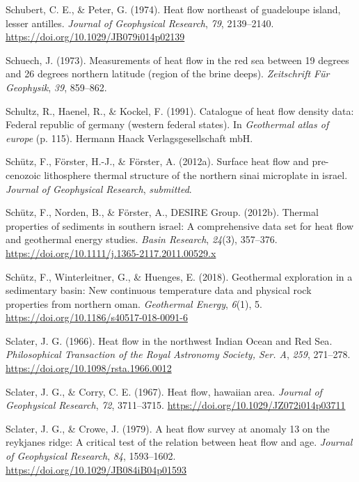 \begin{CSLReferences}{1}{1}
\leavevmode{}%
Schubert, C. E., \& Peter, G. (1974). Heat flow northeast of guadeloupe island, lesser antilles. \emph{Journal of Geophysical Research}, \emph{79}, 2139--2140. \url{https://doi.org/10.1029/JB079i014p02139}

\leavevmode{}%
Schuech, J. (1973). Measurements of heat flow in the red sea between 19 degrees and 26 degrees northern latitude (region of the brine deeps). \emph{Zeitschrift Für Geophysik}, \emph{39}, 859--862.

\leavevmode{}%
Schultz, R., Haenel, R., \& Kockel, F. (1991). Catalogue of heat flow density data: Federal republic of germany (western federal states). In \emph{Geothermal atlas of europe} (p. 115). Hermann Haack Verlagsgesellschaft mbH.

\leavevmode{}%
Schütz, F., Förster, H.-J., \& Förster, A. (2012a). Surface heat flow and pre-cenozoic lithosphere thermal structure of the northern sinai microplate in israel. \emph{Journal of Geophysical Research}, \emph{submitted}.

\leavevmode{}%
Schütz, F., Norden, B., \& Förster, A., DESIRE Group. (2012b). Thermal properties of sediments in southern israel: A comprehensive data set for heat flow and geothermal energy studies. \emph{Basin Research}, \emph{24}(3), 357--376. \url{https://doi.org/10.1111/j.1365-2117.2011.00529.x}

\leavevmode{}%
Schütz, F., Winterleitner, G., \& Huenges, E. (2018). Geothermal exploration in a sedimentary basin: New continuous temperature data and physical rock properties from northern oman. \emph{Geothermal Energy}, \emph{6}(1), 5. \url{https://doi.org/10.1186/s40517-018-0091-6}

\leavevmode{}%
Sclater, J. G. (1966). Heat flow in the northwest {Indian Ocean and Red Sea}. \emph{Philosophical Transaction of the Royal Astronomy Society, Ser. A}, \emph{259}, 271--278. \url{https://doi.org/10.1098/rsta.1966.0012}

\leavevmode{}%
Sclater, J. G., \& Corry, C. E. (1967). Heat flow, hawaiian area. \emph{Journal of Geophysical Research}, \emph{72}, 3711--3715. \url{https://doi.org/10.1029/JZ072i014p03711}

\leavevmode{}%
Sclater, J. G., \& Crowe, J. (1979). A heat flow survey at anomaly 13 on the reykjanes ridge: A critical test of the relation between heat flow and age. \emph{Journal of Geophysical Research}, \emph{84}, 1593--1602. \url{https://doi.org/10.1029/JB084iB04p01593}


\end{CSLReferences}
